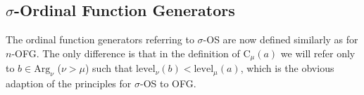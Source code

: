 \documentclass[10pt]{article}
\def\Arg{\mathrm{Arg}}
\def\k{\mathrm{k}}
\def\Cl{{\mathcal{C}l}}
\def\eval{\mathrm{eval}}
\def\C{\mathrm{C}}
\def\NF{\mathrm{NF}}
\def\level{\mathrm{level}}
\begin{document}
\subsection{$\sigma$-Ordinal Function Generators}
The ordinal function generators referring to $\sigma$-OS are now
defined similarly as for $n$-OFG. The only difference is
that in the definition of $\C_\mu(a)$ we will 
refer only to $b \in \Arg_\nu$ ($\nu>\mu$)
such that $\level_\nu(b)< \level_\mu(a)$, which
is the obvious adaption of the principles for $\sigma$-OS to
OFG.\par 
%
%
%
\end{document}
